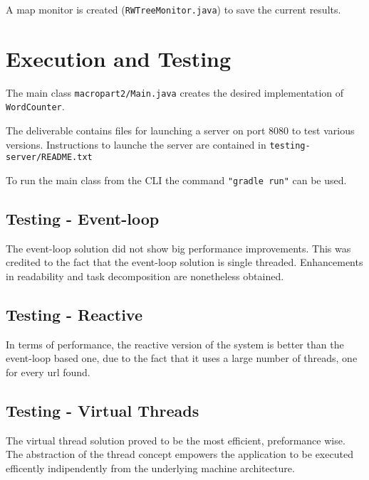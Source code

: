 \documentclass[12pt, a4paper]{report}
\begin{document}
A map monitor is created (\texttt{RWTreeMonitor.java}) to save the current results.

\section{Execution and Testing}
The main class \texttt{macropart2/Main.java} creates the desired implementation of \texttt{WordCounter}.

The deliverable contains files for launching a server on port 8080 to test various versions. Instructions to launche the server are contained in
 \texttt{testing-server/README.txt}

To run the main class from the CLI the command \texttt{"gradle run"} can be used.

\subsection{Testing - Event-loop}
The event-loop solution did not show big performance improvements. This was credited to the fact that the event-loop solution is single threaded.
 Enhancements in readability and task decomposition are nonetheless obtained.

\subsection{Testing - Reactive}
In terms of performance, the reactive version of the system is better than the event-loop based one, due to the fact that it uses a large number of threads, one for every url found.

\subsection{Testing - Virtual Threads}
The virtual thread solution proved to be the most efficient, preformance wise. The abstraction of the thread concept empowers the application to be executed
 efficently indipendently from the underlying machine architecture.


\end{document}
